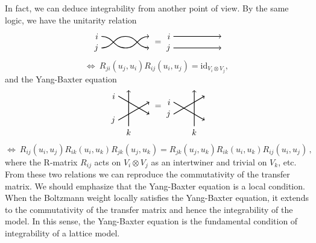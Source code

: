 In fact, we can deduce integrability from another point of view. By
the same logic, we have the unitarity relation
\begin{equation}
    \begin{tikzpicture}[yscale=0.6, baseline=(x.base)]
        \node (x) at (0,0) {\vphantom{x}};

        \draw[thick, ->] (0,0.4) node[left] {$i$} to[out=0, in=180] (1,-0.4) to [out=0, in=180] (2,0.4);
        \draw[thick, ->] (0,-0.4) node[left] {$j$} to[out=0, in=180] (1,0.4) to [out=0, in=180] (2,-0.4);

    \end{tikzpicture}
  \ =
    \begin{tikzpicture}[yscale=0.6, baseline=(x.base)]
        \node (x) at (0,0) {\vphantom{x}};

        \draw[thick, ->] (0,0.4) node[left] {$i$} -- (2,0.4);
        \draw[thick, ->] (0,-0.4) node[left] {$j$} -- (2,-0.4);

    \end{tikzpicture}
\end{equation}
\begin{equation}
   \Longleftrightarrow ~ R_{ji}\left(u_{j},u_{i}\right)R_{ij}\left(u_{i},u_{j}\right)  =  \mathrm{id}_{V_{i}\otimes V_{j}},
\end{equation}
 and the Yang-Baxter equation
\begin{equation}
    \begin{tikzpicture}[scale=0.5, baseline=(x.base)]
        \node (x) at (30:2) {};

        \draw[thick, ->] (0,0) node[left] {$j$} -- ++(30:3);
        \draw[thick, ->] (0,2) node[left] {$i$} -- ++(-30:3);
        \draw[thick, ->] (-30:1) node[below] {$k$} -- ++(0,3);

    \end{tikzpicture}
  \ =
    \begin{tikzpicture}[scale=0.5, baseline=(x.base)]
        \node (x) at (30:1) {};

        \draw[thick, ->] (0,0) node[left] {$j$} -- ++(30:3);
        \draw[thick, ->] (0,1) node[left] {$i$} -- ++(-30:3);
        \draw[thick, ->] (-30:2) node[below] {$k$} -- ++(0,3);

    \end{tikzpicture}
\end{equation}
\begin{equation}
   \Longleftrightarrow ~ R_{ij}\left(u_{i},u_{j}\right)R_{ik}\left(u_{i},u_{k}\right)R_{jk}\left(u_{j},u_{k}\right)
    =  R_{jk}\left(u_{j},u_{k}\right)R_{ik}\left(u_{i},u_{k}\right)R_{ij}\left(u_{i},u_{j}\right) \, ,
\end{equation}
 where the R-matrix $R_{ij}$ acts on $V_{i}\otimes V_{j}$ as an
intertwiner and trivial on $V_{k}$, etc. From these two relations
we can reproduce the commutativity of the transfer matrix. We should
emphasize that the Yang-Baxter equation is a local condition. When
the Boltzmann weight locally satisfies the Yang-Baxter equation, it
extends to the commutativity of the transfer matrix and hence the
integrability of the model. In this sense, the Yang-Baxter equation
is the fundamental condition of integrability of a lattice model.


